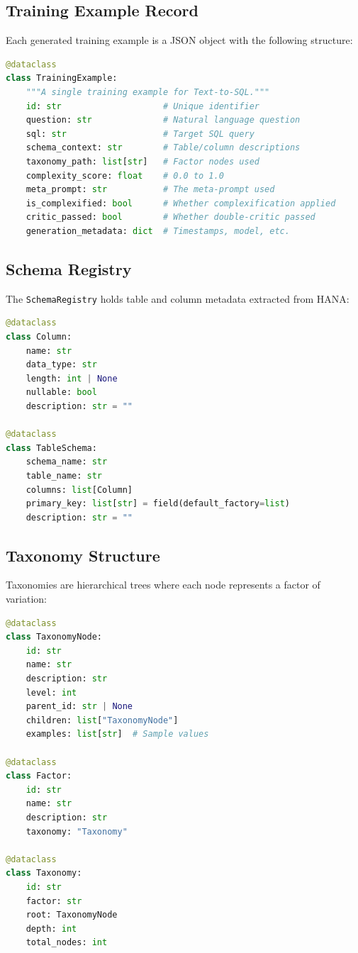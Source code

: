 \documentclass[11pt,a4paper]{article}
\begin{document}
\subsection{Training Example Record}

Each generated training example is a JSON object with the following structure:

\begin{lstlisting}[language=Python,caption={TrainingExample dataclass (simula\_data\_generator.py)}]
@dataclass
class TrainingExample:
    """A single training example for Text-to-SQL."""
    id: str                    # Unique identifier
    question: str              # Natural language question
    sql: str                   # Target SQL query
    schema_context: str        # Table/column descriptions
    taxonomy_path: list[str]   # Factor nodes used
    complexity_score: float    # 0.0 to 1.0
    meta_prompt: str           # The meta-prompt used
    is_complexified: bool      # Whether complexification applied
    critic_passed: bool        # Whether double-critic passed
    generation_metadata: dict  # Timestamps, model, etc.
\end{lstlisting}

\subsection{Schema Registry}

The \texttt{SchemaRegistry} holds table and column metadata extracted from HANA:

\begin{lstlisting}[language=Python,caption={Schema registry structures (schema\_registry.py)}]
@dataclass
class Column:
    name: str
    data_type: str
    length: int | None
    nullable: bool
    description: str = ""

@dataclass
class TableSchema:
    schema_name: str
    table_name: str
    columns: list[Column]
    primary_key: list[str] = field(default_factory=list)
    description: str = ""
\end{lstlisting}

\subsection{Taxonomy Structure}

Taxonomies are hierarchical trees where each node represents a factor of variation:

\begin{lstlisting}[language=Python,caption={Taxonomy structures (simula\_taxonomy\_builder.py)}]
@dataclass
class TaxonomyNode:
    id: str
    name: str
    description: str
    level: int
    parent_id: str | None
    children: list["TaxonomyNode"]
    examples: list[str]  # Sample values

@dataclass
class Factor:
    id: str
    name: str
    description: str
    taxonomy: "Taxonomy"

@dataclass
class Taxonomy:
    id: str
    factor: str
    root: TaxonomyNode
    depth: int
    total_nodes: int
\end{lstlisting}
\end{document}
